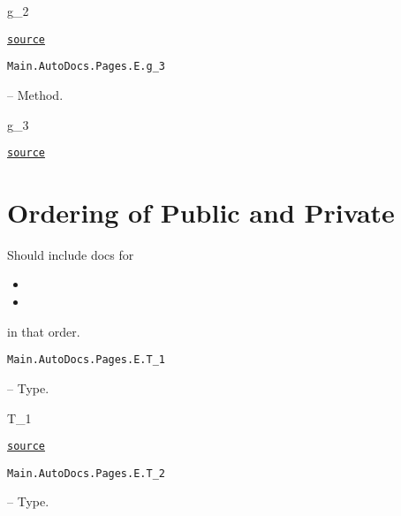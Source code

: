 \begin{adjustwidth}{2em}{0pt}

g\_2



\href{https://github.com/BambOoxX/Documenter.jl/blob/d157febde213549ed0d45c894f0651560da477d3/test/examples/pages/e.jl#L18}{\texttt{source}}


\end{adjustwidth}
\hypertarget{3152146771453799051}{\texttt{Main.AutoDocs.Pages.E.g\_3}}  -- {Method.}

\begin{adjustwidth}{2em}{0pt}

g\_3



\href{https://github.com/BambOoxX/Documenter.jl/blob/d157febde213549ed0d45c894f0651560da477d3/test/examples/pages/e.jl#L21}{\texttt{source}}


\end{adjustwidth}

\section{Ordering of Public and Private}



\label{3913788247092433451}{}


Should include docs for



\begin{itemize}
\item {}


\item {}

\end{itemize}


in that order.


\hypertarget{14143981418775697458}{\texttt{Main.AutoDocs.Pages.E.T\_1}}  -- {Type.}

\begin{adjustwidth}{2em}{0pt}

T\_1



\href{https://github.com/BambOoxX/Documenter.jl/blob/d157febde213549ed0d45c894f0651560da477d3/test/examples/pages/e.jl#L26}{\texttt{source}}


\end{adjustwidth}
\hypertarget{4871421601485935264}{\texttt{Main.AutoDocs.Pages.E.T\_2}}  -- {Type.}


